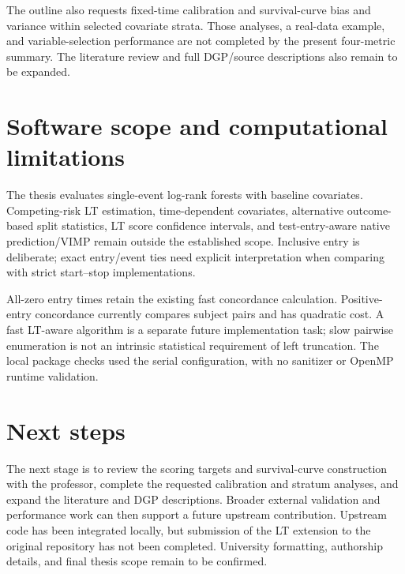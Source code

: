 The outline also requests fixed-time calibration and survival-curve bias
and variance within selected covariate strata. Those analyses, a real-data
example, and variable-selection performance are not completed by the
present four-metric summary. The literature review and full DGP/source
descriptions also remain to be expanded.

\section{Software scope and computational limitations}
The thesis evaluates single-event log-rank forests with baseline
covariates. Competing-risk LT estimation, time-dependent covariates,
alternative outcome-based split statistics, LT score confidence
intervals, and test-entry-aware native prediction/VIMP remain outside
the established scope. Inclusive entry is deliberate; exact entry/event
ties need explicit interpretation when comparing with strict start--stop
implementations.

All-zero entry times retain the existing fast concordance calculation.
Positive-entry concordance currently compares subject pairs and has
quadratic cost. A fast LT-aware algorithm is a separate future
implementation task; slow pairwise enumeration is not an intrinsic
statistical requirement of left truncation. The local package checks used
the serial configuration, with no sanitizer or OpenMP runtime validation.

\section{Next steps}
The next stage is to review the scoring targets and survival-curve
construction with the professor, complete the requested calibration and
stratum analyses, and expand the literature and DGP descriptions.
Broader external validation and performance work can then support a
future upstream contribution. Upstream code has been integrated locally,
but submission of the LT extension to the original repository has not
been completed. University formatting, authorship details, and final
thesis scope remain to be confirmed.
